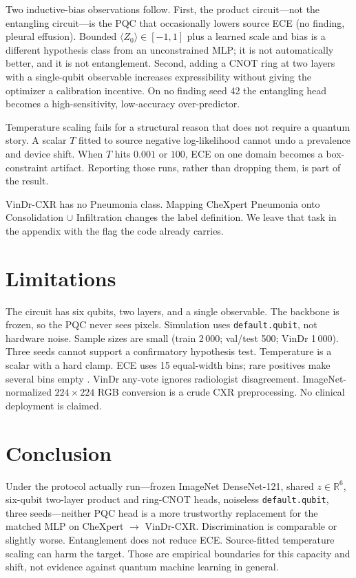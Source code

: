 \documentclass{midl} %
\begin{document}
Two inductive-bias observations follow. First, the product circuit---not the entangling circuit---is the PQC that occasionally lowers source ECE (no finding, pleural effusion). Bounded $\langle Z_0\rangle\in[-1,1]$ plus a learned scale and bias is a different hypothesis class from an unconstrained MLP; it is not automatically better, and it is not entanglement. Second, adding a CNOT ring at two layers with a single-qubit observable increases expressibility without giving the optimizer a calibration incentive. On no finding seed 42 the entangling head becomes a high-sensitivity, low-accuracy over-predictor.

Temperature scaling fails for a structural reason that does not require a quantum story. A scalar $T$ fitted to source negative log-likelihood cannot undo a prevalence and device shift. When $T$ hits $0.001$ or $100$, ECE on one domain becomes a box-constraint artifact. Reporting those runs, rather than dropping them, is part of the result.

VinDr-CXR has no Pneumonia class. Mapping CheXpert Pneumonia onto Consolidation $\cup$ Infiltration changes the label definition. We leave that task in the appendix with the flag the code already carries.

\section{Limitations}

The circuit has six qubits, two layers, and a single observable. The backbone is frozen, so the PQC never sees pixels. Simulation uses \texttt{default.qubit}, not hardware noise. Sample sizes are small (train 2\,000; val/test 500; VinDr 1\,000). Three seeds cannot support a confirmatory hypothesis test. Temperature is a scalar with a hard clamp. ECE uses 15 equal-width bins; rare positives make several bins empty \cite{nixon2019measuring}. VinDr any-vote ignores radiologist disagreement. ImageNet-normalized $224\times 224$ RGB conversion is a crude CXR preprocessing. No clinical deployment is claimed.

\section{Conclusion}

Under the protocol actually run---frozen ImageNet DenseNet-121, shared $z\in\mathbb{R}^{6}$, six-qubit two-layer product and ring-CNOT heads, noiseless \texttt{default.qubit}, three seeds---neither PQC head is a more trustworthy replacement for the matched MLP on CheXpert $\to$ VinDr-CXR. Discrimination is comparable or slightly worse. Entanglement does not reduce ECE. Source-fitted temperature scaling can harm the target. Those are empirical boundaries for this capacity and shift, not evidence against quantum machine learning in general.
\end{document}
